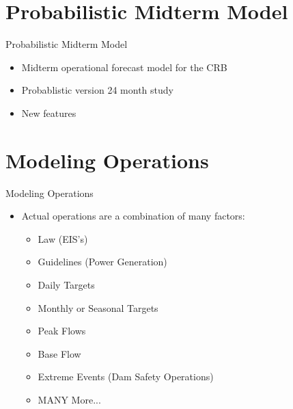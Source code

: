 \documentclass{beamer}
\begin{document}
\section{Probabilistic Midterm Model}
\begin{frame}{Probabilistic Midterm Model}
\begin{itemize}
\item Midterm operational forecast model for the CRB
\item Probablistic version 24 month study
\item New features
\end{itemize}
\pause

\begin{center}
\end{center}

\end{frame}

\section{Modeling Operations}
\begin{frame}{Modeling Operations}

\begin{itemize}
	\item Actual operations are a combination of many factors:
	
	\begin{itemize}
		\item Law (EIS's)
		\item Guidelines (Power Generation)
		\item Daily Targets
		\item Monthly or Seasonal Targets
		\item Peak Flows
		\item Base Flow
		\item Extreme Events (Dam Safety Operations)
		\item MANY More...
	\end{itemize}
\end{itemize}
\end{frame}
\end{document}
